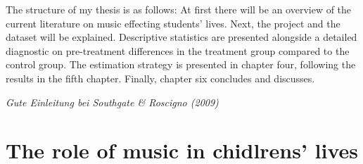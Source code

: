 \documentclass[a4, 12pt]{article}
\begin{document}
The structure of my thesis is as follows: At first there will be an overview of the current literature on music effecting students' lives. Next, the project and the dataset will be explained. Descriptive statistics are presented alongside a detailed diagnostic on pre-treatment differences in the treatment group compared to the control group. The estimation strategy is presented in chapter four, following the results in the fifth chapter. Finally, chapter six concludes and discusses.

\emph{Gute Einleitung bei Southgate \& Roscigno (2009)}

\hypertarget{the-role-of-music-in-chidlrens-lives}{%
\section{The role of music in chidlrens' lives}\label{the-role-of-music-in-chidlrens-lives}}

\clearpage
\end{document}

